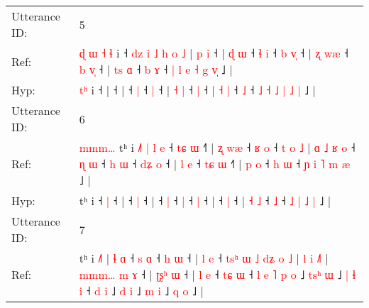 \documentclass[10pt]{article}
\DeclareRobustCommand{\hl}[1]{{\textcolor{red}{#1}}}
\begin{document}
\begin{longtable}{ll}
 \\
\midrule
Utterance ID: & 5 \\
Ref: & \hl{ɖ}\hl{ }\hl{ɯ}\hl{ }\hl{˧}\hl{ }\hl{ɬ} i ˧\hl{ }\hl{d}\hl{z}\hl{ }\hl{i}\hl{ }\hl{˩}\hl{ }\hl{h}\hl{ }\hl{o}\hl{ }\hl{˩} |\hl{ }\hl{p}\hl{ }\hl{i} ˧ |\hl{ }\hl{ɖ}\hl{ }\hl{ɯ} ˧\hl{ }\hl{ɬ} \hl{i} ˧\hl{ }\hl{b} \hl{v}\hl{̩} ˧ | \hl{ʐ} \hl{w}\hl{æ} ˧\hl{ }\hl{b} \hl{v}\hl{̩} ˧ | \hl{t}\hl{s} \hl{ɑ} ˧\hl{ }\hl{b} \hl{ɤ} ˧ \hl{|} \hl{l} \hl{e} \hl{˧} \hl{g} \hl{v}\hl{̩} ˩ |
 \\
Hyp: & \hl{}\hl{}\hl{}\hl{}\hl{}\hl{t}\hl{ʰ} i ˧\hl{}\hl{}\hl{}\hl{}\hl{}\hl{}\hl{}\hl{}\hl{}\hl{}\hl{}\hl{}\hl{} |\hl{}\hl{}\hl{}\hl{} ˧ |\hl{}\hl{}\hl{}\hl{} ˧\hl{}\hl{} \hl{|} ˧\hl{}\hl{} \hl{}\hl{|} ˧ | \hl{˧} \hl{}\hl{|} ˧\hl{}\hl{} \hl{}\hl{|} ˧ | \hl{}\hl{˧} \hl{|} ˧\hl{}\hl{} \hl{˩} ˧ \hl{˩} \hl{˧} \hl{˩} \hl{|} \hl{˩} \hl{}\hl{|} ˩ |
 \\
\midrule
Utterance ID: & 6 \\
Ref: & \hl{m}\hl{m}\hl{m}\hl{…}\hl{ }tʰ i\hl{ }\hl{˩}\hl{˥}\hl{ }\hl{|}\hl{ }\hl{l}\hl{ }\hl{e} ˧\hl{ }\hl{t}\hl{ɕ} \hl{ɯ} ˧\hl{˥} |\hl{ }\hl{ʐ}\hl{ }\hl{w}\hl{æ} ˧\hl{ }\hl{ʁ} \hl{o} ˧\hl{ }\hl{t}\hl{ }\hl{o}\hl{ }\hl{˩} |\hl{ }\hl{ɑ}\hl{ }\hl{˩}\hl{ }\hl{ʁ}\hl{ }\hl{o} ˧\hl{ }\hl{ɳ} \hl{ɯ} ˧\hl{ }\hl{h} \hl{ɯ} ˧\hl{ }\hl{d}\hl{ʑ} \hl{o} ˧ |\hl{ }\hl{l}\hl{ }\hl{e} ˧\hl{ }\hl{t}\hl{ɕ} \hl{ɯ} ˧\hl{˥} | \hl{p} \hl{o} ˧\hl{ }\hl{h} \hl{ɯ} ˧\hl{ }\hl{ɲ} \hl{i} \hl{˥} \hl{m} \hl{æ} ˩ |
 \\
Hyp: & \hl{}\hl{}\hl{}\hl{}\hl{}tʰ i\hl{}\hl{}\hl{}\hl{}\hl{}\hl{}\hl{}\hl{}\hl{} ˧\hl{}\hl{}\hl{} \hl{|} ˧\hl{} |\hl{}\hl{}\hl{}\hl{}\hl{} ˧\hl{}\hl{} \hl{|} ˧\hl{}\hl{}\hl{}\hl{}\hl{}\hl{} |\hl{}\hl{}\hl{}\hl{}\hl{}\hl{}\hl{}\hl{} ˧\hl{}\hl{} \hl{|} ˧\hl{}\hl{} \hl{|} ˧\hl{}\hl{}\hl{} \hl{|} ˧ |\hl{}\hl{}\hl{}\hl{} ˧\hl{}\hl{}\hl{} \hl{|} ˧\hl{} | \hl{˧} \hl{˩} ˧\hl{}\hl{} \hl{˩} ˧\hl{}\hl{} \hl{˩} \hl{|} \hl{˩} \hl{|} ˩ |
 \\
\midrule
Utterance ID: & 7 \\
Ref: & tʰ i \hl{˩}\hl{˥} |\hl{ }\hl{ɬ}\hl{ }\hl{ɑ} ˧\hl{ }\hl{s} \hl{ɑ} ˧\hl{ }\hl{h} \hl{ɯ} ˧ |\hl{ }\hl{l}\hl{ }\hl{e} ˧\hl{ }\hl{t}\hl{s}\hl{ʰ}\hl{ }\hl{ɯ}\hl{ }\hl{˩}\hl{ }\hl{d}\hl{ʑ}\hl{ }\hl{o}\hl{ }\hl{˩} | \hl{l} \hl{i} \hl{˩}\hl{˥} |\hl{ }\hl{m}\hl{m}\hl{m}\hl{…} \hl{m} \hl{ɤ} ˧ | \hl{ʈ}\hl{ʂ}\hl{ʰ} \hl{ɯ} ˧ | \hl{l} \hl{e} ˧\hl{ }\hl{t}\hl{ɕ} \hl{ɯ} ˧\hl{ }\hl{l} \hl{e} \hl{˥} \hl{p} \hl{o} ˩\hl{ }\hl{t}\hl{s}\hl{ʰ} \hl{ɯ} ˩\hl{ }\hl{|}\hl{ }\hl{ɬ}\hl{ }\hl{i} ˧\hl{ }\hl{d}\hl{ }\hl{i} ˩\hl{ }\hl{d} \hl{i} ˩\hl{ }\hl{m} \hl{i} ˩\hl{ }\hl{q} \hl{o} ˩ |

\end{longtable}
\end{document}
